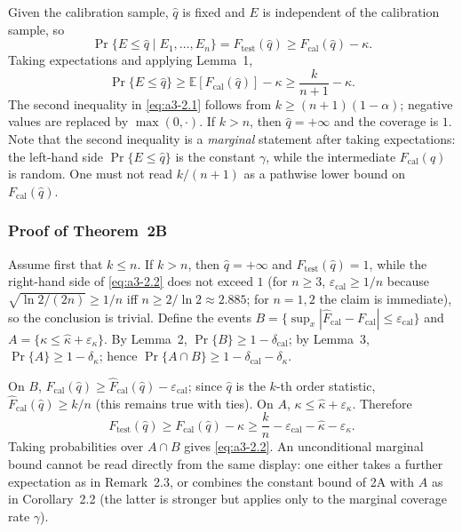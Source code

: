 Given the calibration sample, $\hat q$ is fixed and $E$ is independent of the
calibration sample, so
\[
\Pr\{E\le\hat q\mid E_1,\dots,E_n\}=F_{\mathrm{test}}(\hat q)
\ge F_{\mathrm{cal}}(\hat q)-\kappa.
\]
Taking expectations and applying Lemma~1,
\[
\Pr\{E\le\hat q\}
\ge \mathbb E[F_{\mathrm{cal}}(\hat q)]-\kappa
\ge \frac{k}{n+1}-\kappa.
\]
The second inequality in \eqref{eq:a3-2.1} follows from
$k\ge(n+1)(1-\alpha)$; negative values are replaced by $\max(0,\cdot)$. If $k>n$,
then $\hat q=+\infty$ and the coverage is $1$. Note that the second inequality is a
\emph{marginal} statement after taking expectations: the left-hand side
$\Pr\{E\le\hat q\}$ is the constant $\gamma$, while the intermediate
$F_{\mathrm{cal}}(\hat q)$ is random. One must not read $k/(n+1)$ as a pathwise
lower bound on $F_{\mathrm{cal}}(\hat q)$.

\subsubsection{Proof of Theorem~2B}

Assume first that $k\le n$. If $k>n$, then $\hat q=+\infty$ and
$F_{\mathrm{test}}(\hat q)=1$, while the right-hand side of \eqref{eq:a3-2.2} does
not exceed $1$ (for $n\ge3$, $\varepsilon_{\mathrm{cal}}\ge1/n$ because
$\sqrt{\ln2/(2n)}\ge1/n$ iff $n\ge2/\ln2\approx2.885$; for $n=1,2$ the claim is
immediate), so the conclusion is trivial. Define the events
$B=\{\sup_x|\hat F_{\mathrm{cal}}-F_{\mathrm{cal}}|\le\varepsilon_{\mathrm{cal}}\}$
and $A=\{\kappa\le\hat\kappa+\varepsilon_\kappa\}$. By Lemma~2,
$\Pr\{B\}\ge1-\delta_{\mathrm{cal}}$; by Lemma~3, $\Pr\{A\}\ge1-\delta_\kappa$;
hence $\Pr\{A\cap B\}\ge1-\delta_{\mathrm{cal}}-\delta_\kappa$.

On $B$, $F_{\mathrm{cal}}(\hat q)\ge\hat F_{\mathrm{cal}}(\hat q)-\varepsilon_{\mathrm{cal}}$;
since $\hat q$ is the $k$-th order statistic,
$\hat F_{\mathrm{cal}}(\hat q)\ge k/n$ (this remains true with ties). On $A$,
$\kappa\le\hat\kappa+\varepsilon_\kappa$. Therefore
\[
F_{\mathrm{test}}(\hat q)
\ge F_{\mathrm{cal}}(\hat q)-\kappa
\ge \frac{k}{n}-\varepsilon_{\mathrm{cal}}-\hat\kappa-\varepsilon_\kappa.
\]
Taking probabilities over $A\cap B$ gives \eqref{eq:a3-2.2}. An unconditional
marginal bound cannot be read directly from the same display: one either takes a
further expectation as in Remark~2.3, or combines the constant bound of 2A with
$A$ as in Corollary~2.2 (the latter is stronger but applies only to the marginal
coverage rate $\gamma$).

